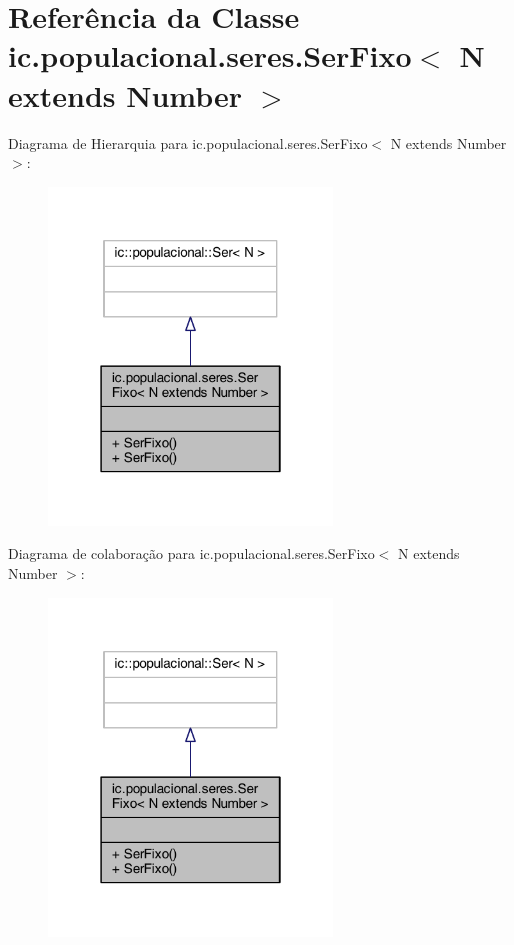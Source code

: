 \hypertarget{classic_1_1populacional_1_1seres_1_1_ser_fixo_3_01_n_01extends_01_number_01_4}{\section{Referência da Classe ic.\-populacional.\-seres.\-Ser\-Fixo$<$ N extends Number $>$}
\label{classic_1_1populacional_1_1seres_1_1_ser_fixo_3_01_n_01extends_01_number_01_4}
}


Diagrama de Hierarquia para ic.\-populacional.\-seres.\-Ser\-Fixo$<$ N extends Number $>$\-:\nopagebreak
\begin{figure}[H]
\begin{center}
\leavevmode
\includegraphics[width=214pt]{classic_1_1populacional_1_1seres_1_1_ser_fixo_3_01_n_01extends_01_number_01_4__inherit__graph}
\end{center}
\end{figure}


Diagrama de colaboração para ic.\-populacional.\-seres.\-Ser\-Fixo$<$ N extends Number $>$\-:\nopagebreak
\begin{figure}[H]
\begin{center}
\leavevmode
\includegraphics[width=214pt]{classic_1_1populacional_1_1seres_1_1_ser_fixo_3_01_n_01extends_01_number_01_4__coll__graph}
\end{center}
\end{figure}
